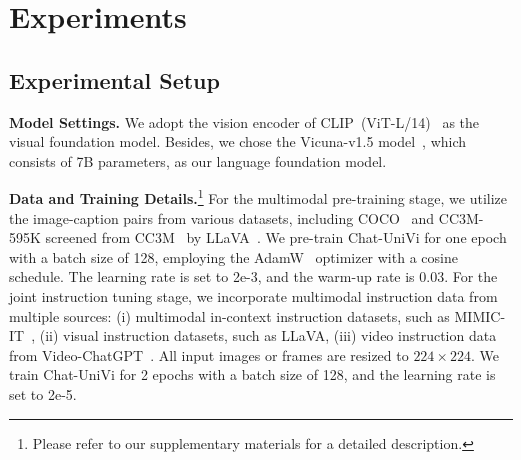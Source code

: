 \documentclass[10pt,twocolumn,letterpaper]{article}
\newcommand{\myparagraph}[1]{\textbf{#1}\hspace{1.8ex}}
\begin{document}
\section{Experiments}
\subsection{Experimental Setup}\label{Experimental Setup0}
\noindent  \myparagraph{Model Settings.} We adopt the vision encoder of CLIP~(ViT-L/14)~\cite{radford2021learning} as the visual foundation model. Besides, we chose the Vicuna-v1.5 model~\cite{vicuna}, which consists of 7B parameters, as our language foundation model.

\noindent \myparagraph{Data and Training Details.}\footnote{Please refer to our supplementary materials for a detailed description.} For the multimodal pre-training stage, we utilize the image-caption pairs from various datasets, including COCO~\cite{chen2015microsoft} and CC3M-595K screened from CC3M~\cite{sharma2018conceptual} by LLaVA~\cite{liu2023visual}. We pre-train Chat-UniVi for one epoch with a batch size of 128, employing the AdamW~\cite{kingma2014adam,loshchilov2017decoupled} optimizer with a cosine schedule. The learning rate is set to 2e-3, and the warm-up rate is 0.03. For the joint instruction tuning stage, we incorporate multimodal instruction data from multiple sources: (i) multimodal in-context instruction datasets, such as MIMIC-IT~\cite{li2023otter,antol2015vqa,hudson2019gqa}, (ii) visual instruction datasets, such as LLaVA, (iii) video instruction data from Video-ChatGPT~\cite{maaz2023video}. All input images or frames are resized to $224\times224$. We train Chat-UniVi for 2 epochs with a batch size of 128, and the learning rate is set to 2e-5.
\end{document}
